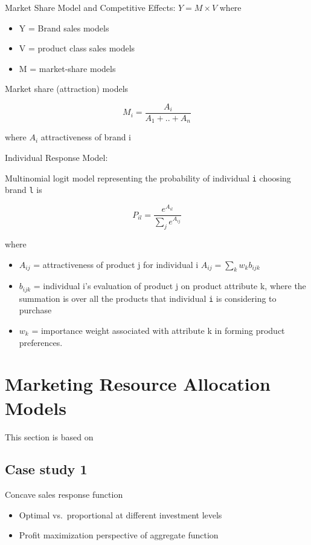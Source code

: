 \documentclass[
]{book}
\providecommand{\tightlist}{%
  \setlength{\itemsep}{0pt}\setlength{\parskip}{0pt}}
\begin{document}
Market Share Model and Competitive Effects: \(Y = M \times V\) where

\begin{itemize}
\item
  Y = Brand sales models
\item
  V = product class sales models
\item
  M = market-share models
\end{itemize}

Market share (attraction) models

\[
M_i = \frac{A_i}{A_1 + ..+ A_n}
\]

where \(A_i\) attractiveness of brand i

Individual Response Model:

Multinomial logit model representing the probability of individual \texttt{i} choosing brand \texttt{l} is

\[
P_{il} = \frac{e^{A_{il}}}{\sum_j e^{A_{ij}}}
\]

where

\begin{itemize}
\tightlist
\item
  \(A_{ij}\) = attractiveness of product j for individual i \(A_{ij} = \sum_k w_k b_{ijk}\)
\item
  \(b_{ijk}\) = individual i's evaluation of product j on product attribute k, where the summation is over all the
  products that individual \texttt{i} is considering to purchase
\item
  \(w_k\) = importance weight associated with attribute k in forming product preferences.
\end{itemize}

\hypertarget{marketing-resource-allocation-models}{%
\section{Marketing Resource Allocation Models}\label{marketing-resource-allocation-models}}

This section is based on \citep{Mantrala_1992}

\hypertarget{case-study-1}{%
\subsection{Case study 1}\label{case-study-1}}

Concave sales response function

\begin{itemize}
\tightlist
\item
  Optimal vs.~proportional at different investment levels
\item
  Profit maximization perspective of aggregate function
\end{itemize}
\end{document}

